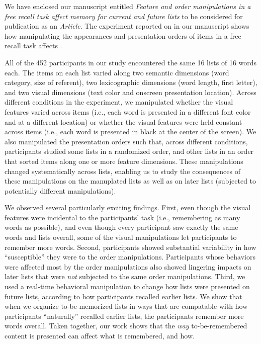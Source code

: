 \documentclass[11pt,stdletter,orderfromtodate,sigleft]{newlfm}
\newcommand{\articletype}{Article}
\newcommand{\myTitle}{Feature and order manipulations in a free recall task affect memory for current and future lists}
\begin{document}
\begin{newlfm}

  We have enclosed our manuscript entitled \textit{\myTitle} to be considered
  for publication as an \textit{\articletype}. The experiment reported on in
  our manuscript shows how manipulating the appearances and presentation orders
  of items in a free recall task affects .

  All of the 452 participants in our study encountered the same 16 lists of 16
  words each. The items on each list varied along two semantic dimensions (word
  category, size of referent), two lexicographic dimensions (word length, first
  letter), and two visual dimensions (text color and onscreen presentation
  location). Across different conditions in the experiment, we manipulated
  whether the visual features varied across items (i.e., each word is presented
  in a different font color and at a different location) or whether the visual
  features were held constant across items (i.e., each word is presented in
  black at the center of the screen). We also manipulated the presentation
  orders such that, across different conditions, participants studied some
  lists in a randomized order, and other lists in an order that sorted items
  along one or more feature dimensions. These manipulations changed
  systematically across lists, enabling us to study the consequences of these
  manipulations on the manuplated lists as well as on later lists (subjected to
  potentially different manipulations).

  We observed several particularly exciting findings. First, even though the
  visual features were incidental to the participants' task (i.e., remembering
  as many words as possible), and even though every participant saw exactly the
  same words and lists overall, some of the visual manipulations let
  participants to remember more words. Second, participants showed substantial
  variability in how ``susceptible'' they were to the order manipulations.
  Participants whose behaviors were affected most by the order manipulations
  also showed lingering impacts on later lists that were \textit{not} subjected
  to the same order manipulations. Third, we used a real-time behavioral
  manipulation to change how lists were presented on future lists, according to
  how participants recalled earlier lists. We show that when we organize
  to-be-memorized lists in ways that are compatable with how participants
  ``naturally'' recalled earlier lists, the participants remember more words
  overall. Taken together, our work shows that the \textit{way}
  to-be-remembered content is presented can affect what is remembered, and how.


\end{newlfm}
\end{document}
